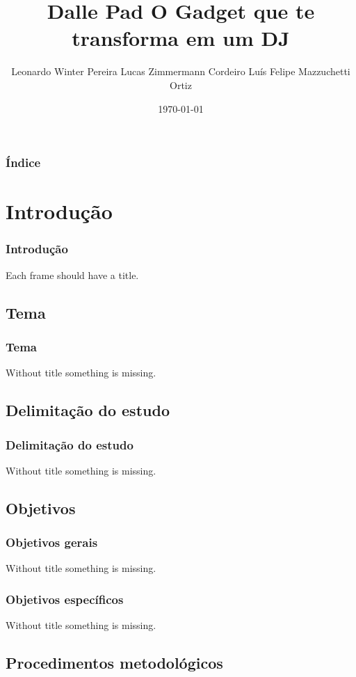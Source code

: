 \documentclass[hyperref={pdfpagelabels=false}]{beamer}
\title{Dalle Pad \newline O Gadget que te transforma em um DJ}
\author{Leonardo Winter Pereira \newline Lucas Zimmermann Cordeiro \newline Luís Felipe Mazzuchetti Ortiz}
\date{\today}
\begin{document}
    \begin{frame}
    \titlepage
    \end{frame}

    \begin{frame}\frametitle{Índice}\tableofcontents
    \end{frame}

        \section{Introdução}

        \begin{frame}\frametitle{Introdução}
        Each frame should have a title.
        \end{frame}

            \subsection{Tema}

            \begin{frame}\frametitle{Tema}
            Without title something is missing.
            \end{frame}

            \subsection{Delimitação do estudo}

            \begin{frame}\frametitle{Delimitação do estudo}
            Without title something is missing.
            \end{frame}

            \subsection{Objetivos}

            \begin{frame}\frametitle{Objetivos gerais}
            Without title something is missing.
            \end{frame}

            \begin{frame}\frametitle{Objetivos específicos}
            Without title something is missing.
            \end{frame}

            \subsection{Procedimentos metodológicos}
\end{document}
